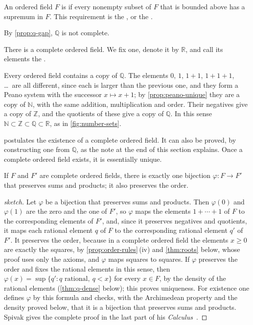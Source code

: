 \begin{definition}
\label{def:complete}
An ordered field $F$ is  if every nonempty subset of $F$ that is bounded above has a supremum in $F$. This requirement is the , or the .
\end{definition}

By \cref{prop:q-gap}, $\mathbb Q$ is not complete.

\begin{assumption}
\label{asm:reals}
There is a complete ordered field. We fix one, denote it by $\mathbb R$, and call its elements the .
\end{assumption}

Every ordered field contains a copy of $\mathbb Q$. The elements $0$, $1$, $1+1$, $1+1+1$, \ldots\ are all different, since each is larger than the previous one, and they form a Peano system with the successor $x\mapsto x+1$; by \cref{prop:peano-unique} they are a copy of $\mathbb N$, with the same addition, multiplication and order. Their negatives give a copy of $\mathbb Z$, and the quotients of these give a copy of $\mathbb Q$. In this sense $\mathbb N\subset\mathbb Z\subset\mathbb Q\subset\mathbb R$, as in \cref{fig:number-sets}.

 postulates the existence of a complete ordered field. It can also be proved, by constructing one from $\mathbb Q$, as the note at the end of this section explains. Once a complete ordered field exists, it is essentially unique.

\begin{theorem}
\label{thm:r-unique}
If $F$ and $F'$ are complete ordered fields, there is exactly one bijection $\varphi\colon F\to F'$ that preserves sums and products; it also preserves the order.
\end{theorem}

\begin{proof}[sketch]
Let $\varphi$ be a bijection that preserves sums and products. Then $\varphi(0)$ and $\varphi(1)$ are the zero and the one of $F'$, so $\varphi$ maps the elements $1+\cdots+1$ of $F$ to the corresponding elements of $F'$, and, since it preserves negatives and quotients, it maps each rational element $q$ of $F$ to the corresponding rational element $q'$ of $F'$. It preserves the order, because in a complete ordered field the elements $x\ge0$ are exactly the squares, by \cref{prop:order-rules}\,(iv) and \cref{thm:roots} below, whose proof uses only the axioms, and $\varphi$ maps squares to squares. If $\varphi$ preserves the order and fixes the rational elements in this sense, then $\varphi(x)=\sup\{q': q\text{ rational},\ q<x\}$ for every $x\in F$, by the density of the rational elements (\cref{thm:q-dense} below); this proves uniqueness. For existence one defines $\varphi$ by this formula and checks, with the Archimedean property and the density proved below, that it is a bijection that preserves sums and products. Spivak gives the complete proof in the last part of his \emph{Calculus}~\cite{spivak2008calculus}.
\end{proof}

